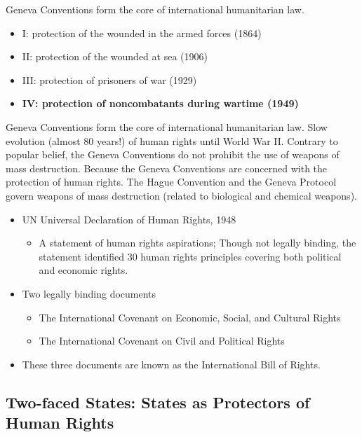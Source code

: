 \documentclass[
]{book}
\providecommand{\tightlist}{%
  \setlength{\itemsep}{0pt}\setlength{\parskip}{0pt}}
\begin{document}
Geneva Conventions form the core of international humanitarian law.

\begin{itemize}
\item
  I: protection of the wounded in the armed forces (1864)
\item
  II: protection of the wounded at sea (1906)
\item
  III: protection of prisoners of war (1929)
\item
  \textbf{IV: protection of noncombatants during wartime (1949)}
\end{itemize}

Geneva Conventions form the core of international humanitarian law. Slow evolution (almost 80 years!) of human rights until World War II. Contrary to popular belief, the Geneva Conventions do not prohibit the use of weapons of mass destruction. Because the Geneva Conventions are concerned with the protection of human rights. The Hague Convention and the Geneva Protocol govern weapons of mass destruction (related to biological and chemical weapons).

\begin{itemize}
\item
  UN Universal Declaration of Human Rights, 1948

  \begin{itemize}
  \tightlist
  \item
    A statement of human rights aspirations; Though not legally binding, the statement identified 30 human rights principles covering both political and economic rights.
  \end{itemize}
\item
  Two legally binding documents

  \begin{itemize}
  \item
    The International Covenant on Economic, Social, and Cultural Rights
  \item
    The International Covenant on Civil and Political Rights
  \end{itemize}
\item
  These three documents are known as the International Bill of Rights.
\end{itemize}

\hypertarget{two-faced-states-states-as-protectors-of-human-rights}{%
\subsection{Two-faced States: States as Protectors of Human Rights}\label{two-faced-states-states-as-protectors-of-human-rights}}
\end{document}
